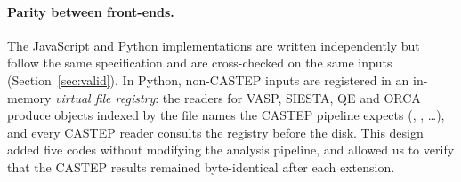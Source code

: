 \paragraph{Parity between front-ends.} The JavaScript and Python implementations are written independently but follow the same specification and are cross-checked on the same inputs (Section~\ref{sec:valid}). In Python, non-CASTEP inputs are registered in an in-memory \emph{virtual file registry}: the readers for VASP, SIESTA, QE and ORCA produce objects indexed by the file names the CASTEP pipeline expects (, , \ldots), and every CASTEP reader consults the registry before the disk. This design added five codes without modifying the analysis pipeline, and allowed us to verify that the CASTEP results remained byte-identical after each extension.
